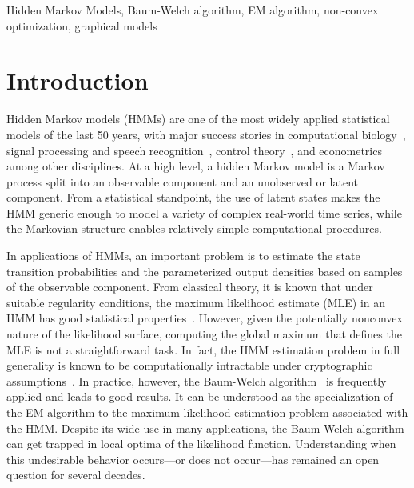 \documentclass[twoside,11pt]{article}
\begin{document}
\begin{keywords}
  Hidden Markov Models, Baum-Welch algorithm, EM algorithm, non-convex
  optimization, graphical models
\end{keywords}

\section{Introduction}

Hidden Markov models (HMMs) are one of the most widely applied
statistical models of the last 50 years, with major success stories in
computational biology~\citep{durbinbook}, signal processing and speech
recognition~\citep{rabinerbook}, control theory~\citep{controlbook}, and
econometrics~\citep{econbook} among other disciplines.  At a high
level, a hidden Markov model is a Markov process split into an
observable component and an unobserved or latent component.  From a
statistical standpoint, the use of latent states makes the HMM generic
enough to model a variety of complex real-world time series, while
the Markovian structure enables relatively simple computational
procedures.

In applications of HMMs, an important problem is to estimate the state
transition probabilities and the parameterized output densities based
on samples of the observable component.  From classical theory, it is
known that under suitable regularity conditions, the maximum
likelihood estimate (MLE) in an HMM has good statistical
properties~\citep{bickel1998}.
However,
given the potentially nonconvex nature of the likelihood surface,
computing the global maximum that defines the MLE is not a
straightforward task.  In fact, the HMM estimation problem in full
generality is known to be computationally intractable under
cryptographic assumptions~\citep{cryptohmm}.  In practice, however, the
Baum-Welch algorithm~\citep{Baum70} is frequently applied and leads to
good results.  It can be understood as the specialization of the EM
algorithm \citep{Dempster77} to the maximum likelihood estimation
problem associated with the HMM.  Despite its wide use in many
applications, the Baum-Welch algorithm can get trapped in local optima
of the likelihood function.  Understanding when this undesirable
behavior occurs---or does not occur---has remained an open question
for several decades.
\end{document}
